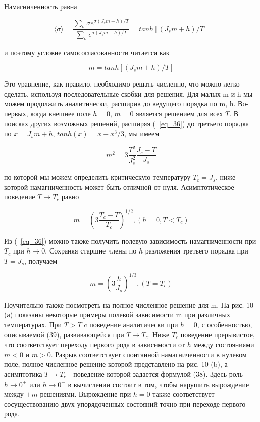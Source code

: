 \documentclass[11pt]{article}
\begin{document}
Намагниченность равна

\begin{equation}
\langle \sigma \rangle = \frac{\sum\limits_\sigma\sigma e^{\sigma(J_sm+h)/T}}{\sum\limits_\sigma e^{\sigma(J_sm+h)/T}} = tanh[(J_sm+h)/T]
\label{eq_35}
\end{equation}

и поэтому условие самосогласованности читается как

\begin{equation}
m = tanh[(J_sm+h)/T]
\label{eq_36}
\end{equation}

Это уравнение, как правило, необходимо решать численно, что можно легко сделать, используя последовательные скобки для решения. Для малых m и h мы можем продолжить аналитически, расширив до ведущего порядка по m, h. Во-первых, когда внешнее поле $h = 0$, $m = 0$ является решением для всех $T$. В поисках других возможных решений, расширяя (~\ref{eq_36}) до третьего порядка по $x = J_s m + h$, $tanh (x) = x - x^3/3$, мы имеем

\begin{equation}
m^2 = 3 \frac{T^2}{J_s^2}\frac{J_s-T}{J_s}
\label{eq_37}
\end{equation}

по которой мы можем определить критическую температуру $T_c = J_s$, ниже которой намагниченность может быть отличной от нуля. Асимптотическое поведение $T → T_c$ равно

\begin{equation}
m=(3\frac{T_c-T}{T_c})^{1/2}, (h=0, T<T_c)
\label{eq_38}
\end{equation}

Из (~\ref{eq_36}) можно также получить полевую зависимость намагниченности при $T_c$ при $h → 0$.
Сохраняя старшие члены по $h$ разложения третьего порядка при $T = J_s$, получаем

\begin{equation}
m=(3\frac{h}{J_s})^{1/3}, (T=T_c)
\label{eq_39}
\end{equation}

Поучительно также посмотреть на полное численное решение для m. На рис. 10 (а) показаны некоторые примеры полевой зависимости m при различных температурах. При $T> T$ c поведение аналитически при $h = 0$, с особенностью, описываемой (39), развивающейся при $T → T_c$.
Ниже $T_c$ поведение прерывистое, что соответствует переходу первого рода в зависимости от $h$ между состояниями $m <0$ и $m> 0$. Разрыв соответствует спонтанной намагниченности в нулевом поле, полное численное решение которой представлено на рис. 10 (b), а асимптотика $T → T_c$ - поведение которой задается формулой (38). Здесь роль $h → 0^{+}$ или $h → 0^{-}$ в вычислении состоит в том, чтобы нарушить вырождение между $\pm m$ решениями. Вырождение при $h = 0$ также соответствует сосуществованию двух упорядоченных состояний точно при переходе первого рода.
\end{document}
